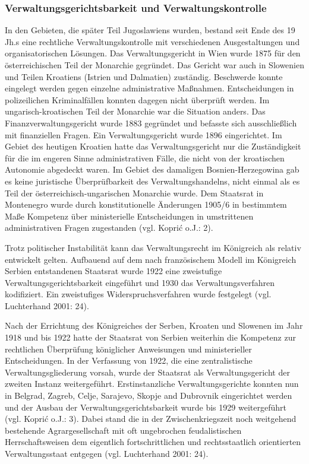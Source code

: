\subsubsection{Verwaltungsgerichtsbarkeit und Verwaltungskontrolle}

In den Gebieten, die später Teil Jugoslawiens wurden, bestand seit Ende des 19 Jh.s eine rechtliche Verwaltungskontrolle mit verschiedenen Ausgestaltungen und organisatorischen Lösungen. Das Verwaltungsgericht in Wien wurde 1875 für den österreichischen Teil der Monarchie gegründet. Das Gericht war auch in Slowenien und Teilen Kroatiens (Istrien und Dalmatien) zuständig. Beschwerde konnte eingelegt werden gegen einzelne administrative Maßnahmen. Entscheidungen in polizeilichen Kriminalfällen konnten dagegen nicht überprüft werden. Im ungarisch-kroatischen Teil der Monarchie war die Situation anders. Das Finanzverwaltungsgericht wurde 1883 gegründet und befasste sich ausschließlich mit finanziellen Fragen. Ein Verwaltungsgericht wurde 1896 eingerichtet. Im Gebiet des heutigen Kroatien hatte das Verwaltungsgericht nur die Zuständigkeit für die im engeren Sinne administrativen Fälle, die nicht von der kroatischen Autonomie abgedeckt waren. Im Gebiet des damaligen Bosnien-Herzegowina gab es keine juristische Überprüfbarkeit des Verwaltungshandelns, nicht einmal als es Teil der österreichisch-ungarischen Monarchie wurde. Dem Staatsrat in Montenegro wurde durch konstitutionelle Änderungen 1905/6 in bestimmtem Maße Kompetenz über ministerielle Entscheidungen in umstrittenen administrativen Fragen zugestanden (vgl. Koprić o.J.: 2).\par
Trotz politischer Instabilität kann das Verwaltungsrecht im Königreich als relativ entwickelt gelten. Aufbauend auf dem nach französischem Modell im Königreich Serbien entstandenen Staatsrat wurde 1922 eine zweistufige Verwaltungsgerichtsbarkeit eingeführt und 1930 das Verwaltungsverfahren kodifiziert. Ein zweistufiges Widerspruchsverfahren wurde festgelegt (vgl. Luchterhand 2001: 24).
\par
Nach der Errichtung des Königreiches der Serben, Kroaten und Slowenen im Jahr 1918 und bis 1922 hatte der Staatsrat von Serbien weiterhin die Kompetenz zur rechtlichen Überprüfung königlicher Anweisungen und ministerieller Entscheidungen. In der Verfassung von 1922, die eine zentralistische Verwaltungsgliederung vorsah, wurde der Staatsrat als Verwaltungsgericht der zweiten Instanz weitergeführt. Erstinstanzliche Verwaltungsgerichte konnten nun in Belgrad, Zagreb, Celje, Sarajevo, Skopje and Dubrovnik eingerichtet werden und der Ausbau der Verwaltungsgerichtsbarkeit wurde bis 1929 weitergeführt (vgl. Koprić o.J.: 3). Dabei stand die in der Zwischenkriegszeit noch weitgehend bestehende Agrargesellschaft mit oft ungebrochen feudalistischen Herrschaftsweisen dem eigentlich fortschrittlichen und rechtsstaatlich orientierten Verwaltungsstaat entgegen (vgl. Luchterhand 2001: 24).

